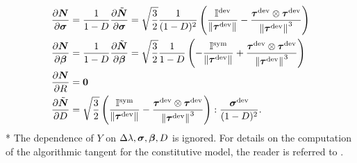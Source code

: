 \begin{align*}
	\pd{\fN}{\fsigma} & = \frac{1}{1-D} \pd{\z{\fN}}{\fsigma} = \sqrt{\frac{3}{2}} \frac{1}{(1-D)^2} \left( \frac{\ffI^{\rm dev}}{\normg{\ftau^{\rm dev}}{}} - \frac{\ftau^{\rm dev} \otimes \ftau^{\rm dev}}{{\normg{\ftau^{\rm dev}}{}}^3} \right)                               \\
	\pd{\fN}{\fbeta}  & = \frac{1}{1-D} \pd{\z{\fN}}{\fbeta} =\sqrt{\frac{3}{2}} \frac{1}{1-D} \left( - \frac{\ffI^{\rm sym}}{\normg{\ftau^{\rm dev}}{}} + \frac{\ftau^{\rm dev} \otimes \ftau^{\rm dev}}{{\normg{\ftau^{\rm dev}}{}}^3} \right)                                   \\
	\pd{\fN}{R}       & = \fzero                                                                                                                                                                                                                                                   \\
	\pd{\z{\fN}}{D}   & = \sqrt{\frac{3}{2}} \left( \frac{\ffI^{\rm sym}}{\normg{\ftau^{\rm dev}}{}} - \frac{\ftau^{\rm dev} \otimes \ftau^{\rm dev}}{{\normg{\ftau^{\rm dev}}{}}^3} \right) \dcontraction \frac{\fsigma^{\rm dev}}{(1-D)^2}.
\end{align*}
* The dependence of $Y$ on $\Delta \lambda, \fsigma, \fbeta, D$ is ignored. For details on the computation of the algorithmic tangent for the constitutive model, the reader is referred to \parencite{de2011computational}.

%
%

\cleardoublepage
{}
{}
\printbibliography
